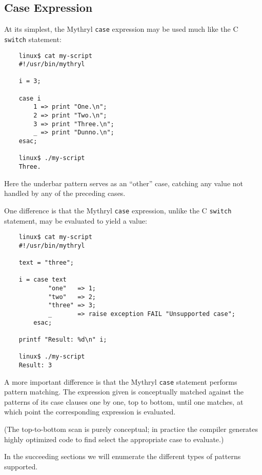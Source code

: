 
\subsection{Case Expression}
\label{section:ref:case-expressions-and-pattern-matching:case-expression}

At its simplest, the Mythryl {\tt case} expression may 
be used much like the C {\tt switch} statement:

\begin{verbatim}
    linux$ cat my-script
    #!/usr/bin/mythryl

    i = 3;

    case i
        1 => print "One.\n";
        2 => print "Two.\n";
        3 => print "Three.\n";
        _ => print "Dunno.\n";
    esac;

    linux$ ./my-script
    Three.
\end{verbatim}

Here the underbar pattern serves as an ``other'' case, 
catching any value not handled by any of the preceding 
cases. 

One difference is that the Mythryl {\tt case} expression, 
unlike the C {\tt switch} statement, may be evaluated to 
yield a value:

\begin{verbatim}
    linux$ cat my-script
    #!/usr/bin/mythryl

    text = "three";

    i = case text
            "one"   => 1;
            "two"   => 2;
            "three" => 3;
            _       => raise exception FAIL "Unsupported case";
        esac;

    printf "Result: %d\n" i;

    linux$ ./my-script
    Result: 3
\end{verbatim}

A more important difference is that the Mythryl {\tt case} 
statement performs pattern matching.  The expression 
given is conceptually matched against the patterns of its 
case clauses one by one, top to bottom, until one matches, 
at which point the corresponding expression is evaluated.

(The top-to-bottom scan is purely conceptual;  in practice 
the compiler generates highly optimized code to find select 
the appropriate case to evaluate.)

In the succeeding sections we will enumerate the different 
types of patterns supported.

